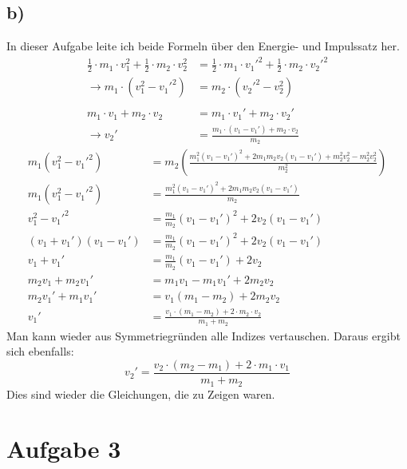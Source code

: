 \documentclass[a4paper,10pt]{extarticle}
\begin{document}
\subsection*{b)}
In dieser Aufgabe leite ich beide Formeln über den Energie- und Impulssatz her.
\begin{align*}
\frac{1}{2}\cdot m_1\cdot v_1^2+\frac{1}{2}\cdot m_2\cdot v_2^2&=\frac{1}{2}\cdot m_1\cdot v_1'^2+\frac{1}{2}\cdot m_2\cdot v_2'^2\\
\rightarrow m_1\cdot(v_1^2-v_1'^2)&=m_2\cdot(v_2'^2-v_2^2)\\ \\
m_1\cdot v_1+m_2\cdot v_2&=m_1\cdot v_1'+m_2\cdot v_2'\\
\rightarrow v_2'&=\frac{m_1\cdot(v_1-v_1')+m_2\cdot v_2}{m_2}
\end{align*}
\begin{align*}
m_1(v_1^2-v_1'^2)&=m_2\left(\frac{m_1^2(v_1-v_1')^2+2m_1m_2v_2(v_1-v_1')+m_2^2v_2^2-m_2^2v_2^2}{m_2^2}\right)\\
m_1(v_1^2-v_1'^2)&=\frac{m_1^2(v_1-v_1')^2+2m_1m_2v_2(v_1-v_1')}{m_2}\\
v_1^2-v_1'^2&=\frac{m_1}{m_2}(v_1-v_1')^2+2v_2(v_1-v_1')\\
(v_1+v_1')(v_1-v_1')&=\frac{m_1}{m_2}(v_1-v_1')^2+2v_2(v_1-v_1')\\
v_1+v_1'&=\frac{m_1}{m_2}(v_1-v_1')+2v_2\\
m_2v_1+m_2v_1'&=m_1v_1-m_1v_1'+2m_2v_2\\
m_2v_1'+m_1v_1'&=v_1(m_1-m_2)+2m_2v_2\\
v_1'&=\frac{v_1\cdot(m_1-m_2)+2\cdot m_2\cdot v_2}{m_1+m_2}
\end{align*}
Man kann wieder aus Symmetriegründen alle Indizes vertauschen. Daraus ergibt sich ebenfalls:
\begin{equation*}
v_2'=\frac{v_2\cdot(m_2-m_1)+2\cdot m_1\cdot v_1}{m_1+m_2}
\end{equation*}
Dies sind wieder die Gleichungen, die zu Zeigen waren.

\section*{Aufgabe 3}
\end{document}
